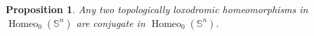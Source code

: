 \documentclass[microtype]{gtpart}
\newcommand{\vp}{\varphi}
\DeclareMathOperator{\Homeo}{Homeo}
\DeclareMathOperator{\fix}{fix}
\renewcommand{\co}{\colon\thinspace}
\newtheorem{Prop}[Thm]{Proposition}
\newtheorem{Lem}[Thm]{Lemma}
\theoremstyle{definition}
\numberwithin{equation}{section}
\newcommand{\nv}[1]{\color{Cerulean}  \{NV: #1\}\color{black}}
\begin{document}
%

\begin{Prop}
\label{prop:conjugate}
Any two topologically loxodromic homeomorphisms in \( \Homeo_0(\mathbb S^n) \) are conjugate in \( \Homeo_0(\mathbb S^n) \). 
\end{Prop}
\end{document}
